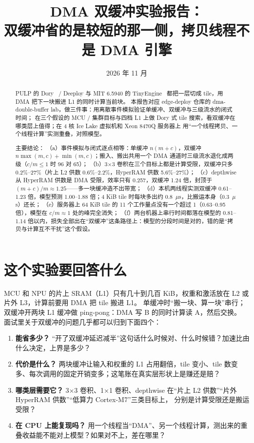 \documentclass[11pt,a4paper]{ctexart}
\title{DMA 双缓冲实验报告：\\双缓冲省的是较短的那一侧，拷贝线程不是 DMA 引擎}
\author{\authorline}
\date{2026 年 11 月}
\begin{document}
\maketitle

\begin{abstract}
PULP 的 Dory~\cite{dory} / Deeploy 与 MIT 6.5940 的 TinyEngine~\cite{mcunet} 都把一层切成 tile，用 DMA 把下一块搬进 L1 的同时计算当前块。
本报告对应 edge-deploy 仓库的 dma-double-buffer lab，做三件事：用离散事件模拟验证单缓冲、双缓冲与三级流水的闭式时间；
在三个假设的 MCU / 集群目标与四档 L1 上做 Dory 式 tile 搜索，看双缓冲在哪类层上值得；在 4 核 Ice Lake 虚拟机和 Xeon 8470Q 服务器上
用“一个线程拷贝、一个线程计算”实测重叠，对照模型。

主要结论：
（a）事件模拟与闭式逐点相等：单缓冲 $n(m+c)$，双缓冲 $n\max(m,c)+\min(m,c)$；搬入、搬出共用一个 DMA 通道时三级流水退化成两级（$c/m\le1$ 时 96 对 65）；
（b）3×3 卷积在三个目标上都是计算受限，双缓冲只多 0.2\%--27\%（片上 L2 供数 0.6\%--2.2\%，HyperRAM 供数 5.6\%--27\%）；
（c）depthwise 从 HyperRAM 供数是 DMA 受限，效率只有 0.257，双缓冲 1.24 倍，封顶于 $(m+c)/m\approx1.25$——多一块缓冲造不出带宽；
（d）本机两线程实测双缓冲 0.61--1.23 倍，模型预测 1.00--1.88 倍；4 KiB tile 时每块多出约 0.8~$\mu$s，比搬运本身（0.3~$\mu$s）还长；
（e）服务器上 64 KiB tile 的 11 个工作量点没有一个超过 1（0.63--0.95 倍），模型在 $c/m\approx1$ 处的峰完全消失；
（f）两台机器上串行时间都落在模型的 0.81--1.14 倍以内，损失全部出在“双缓冲”这条路径上：模型的分段时间是对的，错的是“拷贝与计算互不干扰”这个假设。
\end{abstract}

\tableofcontents
\newpage

\section{这个实验要回答什么}\label{sec:q}

MCU 和 NPU 的片上 SRAM（L1）只有几十到几百 KiB，权重和激活放在 L2 或片外 L3，计算前要用 DMA 把 tile 搬进 L1。
单缓冲时“搬一块、算一块”串行；双缓冲开两块 L1 缓冲做 ping-pong：DMA 写 B 的同时计算读 A，然后交换。
面试里关于双缓冲的问题几乎都可以归到下面四个：

\begin{enumerate}
  \item \textbf{能省多少？} “开了双缓冲延迟减半”这句话什么时候对、什么时候错？加速比由什么决定，上界是多少？
  \item \textbf{代价是什么？} 两块缓冲让输入和权重的 L1 占用翻倍，tile 变小、tile 数变多、每次调用的固定开销变多；这笔账在真实层形状上是赚还是赔？
  \item \textbf{哪类层需要它？} 3×3 卷积、1×1 卷积、depthwise 在“片上 L2 供数”“片外 HyperRAM 供数”“低算力 Cortex-M7”三类目标上，
        分别是计算受限还是搬运受限？
  \item \textbf{在 CPU 上能复现吗？} 用一个线程当“DMA”、另一个线程计算，测出来的重叠收益能不能对上模型？如果对不上，差在哪里？
\end{enumerate}
\end{document}
